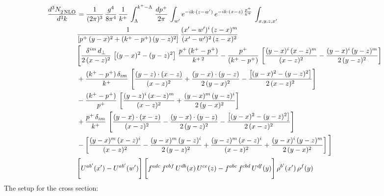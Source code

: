 \documentclass[9pt]{article}
\numberwithin{equation}{section}
\begin{document}
\begin{align}
    \frac{d^{3}N_{2\,\rm NLO}^{\rm}}{d^{3}k}  & =  \frac{1}{(2\pi)^{3}}\,\frac{g^{4}}{8\pi^{4}}\,\frac{1}{k^{+}}\,\int_{\Lambda}^{k^{+}-\Lambda}\, \frac{dp^{+}}{2\pi} \,\int_{ w^\prime} e^{-ik\cdot(z-w')}\,e^{-ik\cdot (x-z)\,\frac{p^{+}}{k^{+}}}\, \int_{x,y,z,x'}\,\notag \\ & \frac{1}{\left[p^{+}\,(y-x)^{2}+(k^{+}-p^{+})\,(y-z)^{2}\right]}\, \frac{(x'-w')^{i}\,(z-x)^{m}}{(x'-w')^{2}\,(z-x)^{2}} \notag \\ & \Bigg[\frac{\delta^{im}\,d_{\perp}}{2\,(x-z)^{2}}\,\left[(y-x)^{2}-(y-z)^{2}\right]\,\frac{p^{+}\,(k^{+}-p^{+})}{k^{+\,2}}-\frac{p^{+}}{(k^{+}-p^{+})}\,\left[\frac{(y-x)^{i}\,(x-z)^{m}}{(x-z)^{2}}-\frac{(y-x)^{i}\,(y-z)^{m}}{2\,(y-z)^{2}}\right]\notag \\ & +\frac{(k^{+}-p^{+})\,\delta_{im}}{k^{+}}\,\left[\frac{(y-z)\cdot (x-z)}{(x-z)^{2}}+\frac{(y-x)\cdot (y-z)}{2\,(y-x)^{2}}-\frac{\left[(y-x)^{2}-(y-z)^{2}\right]}{2\,(x-z)^{2}}\right]\notag \\ & -\frac{(k^{+}-p^{+})}{p^{+}}\,\left[\frac{(y-z)^{i}\,(x-z)^{m}}{(x-z)^{2}}+\frac{(y-x)^{m}\,(y-z)^{i}}{2\,(y-x)^{2}}\right]\notag \\ & +\frac{p^{+}\,\delta_{im}}{k^{+}}\,\left[\frac{(y-x)\cdot (x-z)}{(x-z)^{2}}-\frac{(y-x)\cdot (y-z)}{2\,(y-z)^{2}}-\frac{\left[(y-x)^{2}-(y-z)^{2}\right]}{2\,(x-z)^{2}}\right]\notag \\ &-\left[\frac{(y-x)^{m}\,(x-z)^{i}}{(x-z)^{2}}-\frac{(y-x)^{m}\,(y-z)^{i}}{2\,(y-z)^{2}}+\frac{(y-z)^{m}\,(x-z)^{i}}{(x-z)^{2}}+\frac{(y-x)^{i}\,(y-z)^{m}}{2\,(y-x)^{2}}\right]\Bigg] \notag \\ & \Bigg[U^{ab'}(x')-U^{ab'}(w')\Bigg]\,\Bigg[f^{adc}\,f^{ebf}\,U^{db}(x)\,U^{ce}(z)-f^{abc}\,f^{cbd}\,U^{df}(y)\Bigg]\,\rho^{b'}(x')\,\rho^{f}(y)
\end{align}
The setup for the cross section: 
\end{document}
